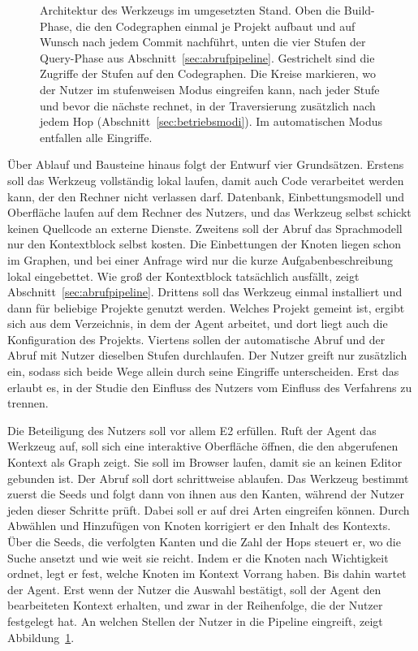\begin{figure}[htbp]
  \caption{Architektur des Werkzeugs im umgesetzten Stand. Oben die Build-Phase, die den Codegraphen einmal je Projekt aufbaut und auf Wunsch nach jedem Commit nachführt, unten die vier Stufen der Query-Phase aus Abschnitt~\ref{sec:abrufpipeline}. Gestrichelt sind die Zugriffe der Stufen auf den Codegraphen. Die Kreise markieren, wo der Nutzer im stufenweisen Modus eingreifen kann, nach jeder Stufe und bevor die nächste rechnet, in der Traversierung zusätzlich nach jedem Hop (Abschnitt~\ref{sec:betriebsmodi}). Im automatischen Modus entfallen alle Eingriffe.}
  \label{fig:pipeline}
\end{figure}

Über Ablauf und Bausteine hinaus folgt der Entwurf vier Grundsätzen. Erstens soll das Werkzeug vollständig lokal laufen, damit auch Code verarbeitet werden kann, der den Rechner nicht verlassen darf. Datenbank, Einbettungsmodell und Oberfläche laufen auf dem Rechner des Nutzers, und das Werkzeug selbst schickt keinen Quellcode an externe Dienste. Zweitens soll der Abruf das Sprachmodell nur den Kontextblock selbst kosten. Die Einbettungen der Knoten liegen schon im Graphen, und bei einer Anfrage wird nur die kurze Aufgabenbeschreibung lokal eingebettet. Wie groß der Kontextblock tatsächlich ausfällt, zeigt Abschnitt~\ref{sec:abrufpipeline}. Drittens soll das Werkzeug einmal installiert und dann für beliebige Projekte genutzt werden. Welches Projekt gemeint ist, ergibt sich aus dem Verzeichnis, in dem der Agent arbeitet, und dort liegt auch die Konfiguration des Projekts. Viertens sollen der automatische Abruf und der Abruf mit Nutzer dieselben Stufen durchlaufen. Der Nutzer greift nur zusätzlich ein, sodass sich beide Wege allein durch seine Eingriffe unterscheiden. Erst das erlaubt es, in der Studie den Einfluss des Nutzers vom Einfluss des Verfahrens zu trennen.

Die Beteiligung des Nutzers soll vor allem E2 erfüllen. Ruft der Agent das Werkzeug auf, soll sich eine interaktive Oberfläche öffnen, die den abgerufenen Kontext als Graph zeigt. Sie soll im Browser laufen, damit sie an keinen Editor gebunden ist. Der Abruf soll dort schrittweise ablaufen. Das Werkzeug bestimmt zuerst die Seeds und folgt dann von ihnen aus den Kanten, während der Nutzer jeden dieser Schritte prüft. Dabei soll er auf drei Arten eingreifen können. Durch Abwählen und Hinzufügen von Knoten korrigiert er den Inhalt des Kontexts. Über die Seeds, die verfolgten Kanten und die Zahl der Hops steuert er, wo die Suche ansetzt und wie weit sie reicht. Indem er die Knoten nach Wichtigkeit ordnet, legt er fest, welche Knoten im Kontext Vorrang haben. Bis dahin wartet der Agent. Erst wenn der Nutzer die Auswahl bestätigt, soll der Agent den bearbeiteten Kontext erhalten, und zwar in der Reihenfolge, die der Nutzer festgelegt hat. An welchen Stellen der Nutzer in die Pipeline eingreift, zeigt Abbildung~\ref{fig:pipeline}.

